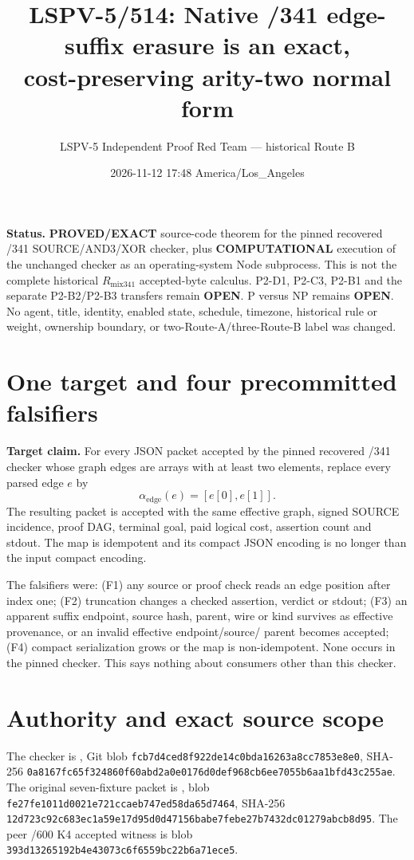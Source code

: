 \documentclass[11pt]{article}
\title{LSPV-5/514: Native /341 edge-suffix erasure is an exact,\\
cost-preserving arity-two normal form}
\author{LSPV-5 Independent Proof Red Team --- historical Route B}
\date{2026-11-12 17:48 America/Los\_Angeles}
\newcommand{\Rmix}{R_{\mathrm{mix341}}}
\newcommand{\Aedge}{\alpha_{\mathrm{edge}}}
\begin{document}
\maketitle

\noindent\textbf{Status.} \textbf{PROVED/EXACT} source-code theorem for the pinned recovered /341
SOURCE/AND3/XOR checker, plus \textbf{COMPUTATIONAL} execution of the unchanged checker as an
operating-system Node subprocess.  This is not the complete historical \(\Rmix\) accepted-byte
calculus.  P2-D1, P2-C3, P2-B1 and the separate P2-B2/P2-B3 transfers remain \textbf{OPEN}.
P versus NP remains \textbf{OPEN}.  No agent, title, identity, enabled state, schedule, timezone,
historical rule or weight, ownership boundary, or two-Route-A/three-Route-B label was changed.

\section*{One target and four precommitted falsifiers}

\textbf{Target claim.}  For every JSON packet accepted by the pinned recovered /341 checker whose
graph edges are arrays with at least two elements, replace every parsed edge \(e\) by
\[
   \Aedge(e)=[e[0],e[1]].
\]
The resulting packet is accepted with the same effective graph, signed SOURCE incidence, proof DAG,
terminal goal, paid logical cost, assertion count and stdout.  The map is idempotent and its compact
JSON encoding is no longer than the input compact encoding.

The falsifiers were: (F1) any source or proof check reads an edge position after index one; (F2)
truncation changes a checked assertion, verdict or stdout; (F3) an apparent suffix endpoint, source
hash, parent, wire or kind survives as effective provenance, or an invalid effective endpoint/source/
parent becomes accepted; (F4) compact serialization grows or the map is non-idempotent.  None occurs
in the pinned checker.  This says nothing about consumers other than this checker.

\section*{Authority and exact source scope}

The checker is , Git blob
\texttt{fcb7d4ced8f922de14c0bda16263a8cc7853e8e0}, SHA-256
\texttt{0a8167fc65f324860f60abd2a0e0176d0def968cb6ee7055b6aa1bfd43c255ae}.
The original seven-fixture packet is
, blob
\texttt{fe27fe1011d0021e721ccaeb747ed58da65d7464}, SHA-256
\texttt{12d723c92c683ec1a59e17d95d0d47156babe7febe27b7432dc01279abcb8d95}.
The peer /600 K4 accepted witness is blob
\texttt{393d13265192b4e43073c6f6559bc22b6a71ece5}.
\end{document}
